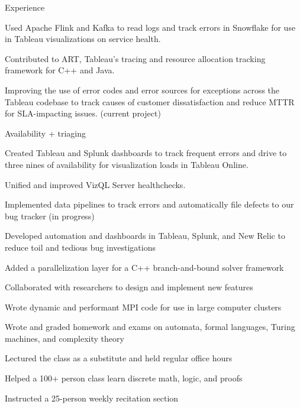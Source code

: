 \documentclass{cv}
\begin{document}

\begin{cvsection}{Experience}
  {
    \item Used Apache Flink and Kafka to read logs and track errors in Snowflake for use in Tableau visualizations on service health.
    \item Contributed to ART, Tableau's tracing and resource allocation tracking framework for C++ and Java.
    \item Improving the use of error codes and error sources for exceptions across the Tableau codebase to track causes of customer dissatisfaction and reduce MTTR for SLA-impacting issues. (current project)
    \item Availability + triaging
    \item Created Tableau and Splunk dashboards to track frequent errors and drive to three nines of availability for visualization loads in Tableau Online.
    \item Unified and improved VizQL Server healthchecks.

    \item Implemented data pipelines to track errors and automatically file
        defects to our bug tracker (in progress)
    \item Developed automation and dashboards in Tableau, Splunk, and New
        Relic to reduce toil and tedious bug investigations
  }
  {
    \item Added a parallelization layer for a C++ branch-and-bound solver framework
    \item Collaborated with researchers to design and implement new features
    \item Wrote dynamic and performant MPI code for use in large computer clusters
  }
  {
    \item Wrote and graded homework and exams on automata, formal languages, Turing machines, and complexity theory
    \item Lectured the class as a substitute and held regular office hours
  }
  {
    \item Helped a 100+ person class learn discrete math, logic, and proofs
    \item Instructed a 25-person weekly recitation section
  }
\end{cvsection}
\end{document}
